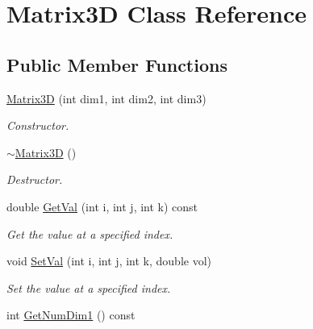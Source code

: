 \hypertarget{classMatrix3D}{
\section{Matrix3D Class Reference}
\label{d0/dcb/classMatrix3D}
}
\subsection*{Public Member Functions}
\begin{DoxyCompactItemize}
\item 
\hypertarget{classMatrix3D_a79ffea45e6ad9f5789f5444f033cb8f4}{
\hyperlink{classMatrix3D_a79ffea45e6ad9f5789f5444f033cb8f4}{Matrix3D} (int dim1, int dim2, int dim3)}
\label{d0/dcb/classMatrix3D_a79ffea45e6ad9f5789f5444f033cb8f4}

\begin{DoxyCompactList}\small\item\em Constructor. \item\end{DoxyCompactList}\item 
\hypertarget{classMatrix3D_a67ebf80ff62e71d327066491811401af}{
\hyperlink{classMatrix3D_a67ebf80ff62e71d327066491811401af}{$\sim$Matrix3D} ()}
\label{d0/dcb/classMatrix3D_a67ebf80ff62e71d327066491811401af}

\begin{DoxyCompactList}\small\item\em Destructor. \item\end{DoxyCompactList}\item 
\hypertarget{classMatrix3D_a8422daf16b13a3a26f3856dcadfae291}{
double \hyperlink{classMatrix3D_a8422daf16b13a3a26f3856dcadfae291}{GetVal} (int i, int j, int k) const }
\label{d0/dcb/classMatrix3D_a8422daf16b13a3a26f3856dcadfae291}

\begin{DoxyCompactList}\small\item\em Get the value at a specified index. \item\end{DoxyCompactList}\item 
\hypertarget{classMatrix3D_a082378ce9c6565d0655cb0ec2e68116c}{
void \hyperlink{classMatrix3D_a082378ce9c6565d0655cb0ec2e68116c}{SetVal} (int i, int j, int k, double vol)}
\label{d0/dcb/classMatrix3D_a082378ce9c6565d0655cb0ec2e68116c}

\begin{DoxyCompactList}\small\item\em Set the value at a specified index. \item\end{DoxyCompactList}\item 
\hypertarget{classMatrix3D_a97e904be2b5177157d7ecb11488c6ef3}{
int \hyperlink{classMatrix3D_a97e904be2b5177157d7ecb11488c6ef3}{GetNumDim1} () const }
\label{d0/dcb/classMatrix3D_a97e904be2b5177157d7ecb11488c6ef3}


\end{DoxyCompactItemize}
